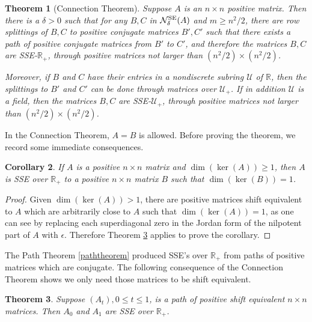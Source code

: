 \documentclass{amsart}
\newtheorem{theorem}{Theorem}[section]
\newtheorem{corollary}[theorem]{Corollary}
\theoremstyle{definition}
\theoremstyle{remark}
\numberwithin{equation}{section}
\begin{document}
{{\begin{theorem}[Connection Theorem]\label{connectiontheorem}
Suppose $A$ is an $n\times n$ positive matrix. Then there 
is a $\delta >0$ such that for any $B,C$ in 
$\mathcal N_{\delta}^{\textnormal{SE}}(A)$ and $m\geq n^2/2$,  there are row 
splittings of $B,C$ to positive conjugate matrices $B',C'$ 
such that there exists a path of positive conjugate matrices 
from $B'$ to $C'$, and therefore 
the matrices $B,C$ are 
SSE-$\mathbb R_+$, through positive matrices 
not larger 
than $(n^2/2)\times (n^2/2)$. 

Moreover, if $B$ and $C$ have their 
entries in a nondiscrete subring $\mathcal U$ of $\mathbb R$, then 
the splittings to $B'$ and $C'$ can be done through matrices over 
$\mathcal U_+$. If in addition $\mathcal U$ is a field, then 
the matrices $B,C$ are 
SSE-$\mathcal U_+$, through positive matrices
not larger 
than $(n^2/2)\times (n^2/2)$. 
\end{theorem} 

In the Connection Theorem, $A=B$ is allowed. 
Before proving the theorem, we record some 
immediate consequences. 

\begin{corollary} 
If $A$ is a 
 positive $n\times n$ matrix and 
$\dim (\ker (A))\geq 1$, then  
$A$ is  SSE over $\mathbb R_+$ to a positive  
$n\times n$ matrix $B$ such that $\dim (\ker (B))=1$. 
\end{corollary} 

\begin{proof} 
Given $\dim (\ker (A))>1$, 
there are positive 
matrices shift equivalent to $A$ 
which are arbitrarily close to $A$ 
such that $\dim (\ker (A))=1$, as one can 
see by replacing each superdiagonal zero in the Jordan form 
of the nilpotent part of $A$ with $\epsilon$. 
Therefore Theorem \ref{sepaththeorem} applies to 
prove the corollary. 
\end{proof}  
 
The Path Theorem \ref{paththeorem} produced SSE's over $\mathbb R_+$ from 
paths of positive matrices which are conjugate. The following 
  consequence of the Connection Theorem 
shows we only need those matrices to be shift equivalent. 

\begin{theorem}\label{sepaththeorem} Suppose $(A_t), 0\leq t \leq 1$, 
is a path of 
positive shift equivalent $n\times n$ matrices. Then $A_0$ and $A_1$ are 
SSE over $\mathbb R_+$. 
\end{theorem} 

}}
\end{document}
